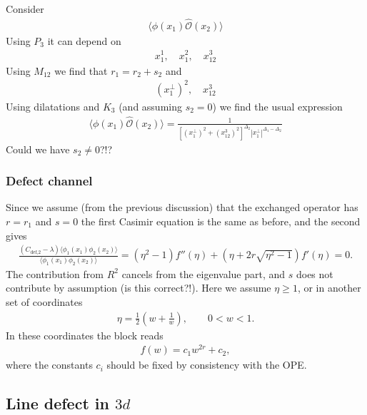 \documentclass[letterpaper]{article}
\let\Oldsubsection\subsection
\renewcommand{\subsection}{\FloatBarrier\Oldsubsection}
\let\Oldsubsubsection\subsubsection
\renewcommand{\subsubsection}{\FloatBarrier\Oldsubsubsection}
\def\Om{{\mathcal{O}}}
\begin{document}
Consider
\begin{align}
 \langle \phi(x_1) \hat \Om(x_2) \rangle
\end{align}
Using $P_3$ it can depend on
\begin{align}
 x_1^1, \quad
 x_1^2, \quad
 x_{12}^3
\end{align}
Using $M_{12}$ we find that $r_1 = r_2 + s_2$ and 
\begin{align}
 (x_1^\perp)^2, \quad
 x_{12}^3
\end{align}
Using dilatations and $K_3$ (and assuming $s_2 = 0$) we find the usual expression
\begin{align}
 \langle \phi(x_1) \hat \Om(x_2) \rangle
 = \frac{1}{[(x_1^\perp)^2 + (x_{12}^3)^2]^{\Delta_2}
 |x_1^\perp|^{\Delta_1 - \Delta_2}} 
\end{align}
Could we have $s_2 \ne 0$?!?

\subsubsection{Defect channel}

Since we assume (from the previous discussion) that the exchanged operator has $r = r_1$ and $s = 0$ the first Casimir equation is the same as before, and the second gives
\begin{align}
 \frac{(C_{\text{def,2}} - \lambda) \langle \phi_1(x_1) \phi_2(x_2) \rangle}
      {\langle \phi_1(x_1) \phi_2(x_2) \rangle}
 = (\eta^2 - 1) f''(\eta) + (\eta + 2r \sqrt{\eta^2-1}) f'(\eta)
 = 0.
\end{align}
The contribution from $R^2$ cancels from the eigenvalue part, and $s$ does not contribute by assumption (is this correct?!).
Here we assume $\eta \ge 1$, or in another set of coordinates
\begin{align}
 \eta = \frac{1}{2} \left( w + \frac{1}{w} \right), \qquad
 0 < w < 1.
\end{align}
In these coordinates the block reads
\begin{align}
 f(w) = c_1 w^{2r} + c_2,
\end{align}
where the constants $c_i$ should be fixed by consistency with the OPE.



\subsection{Line defect in \texorpdfstring{$3d$}{3d}}
\end{document}
